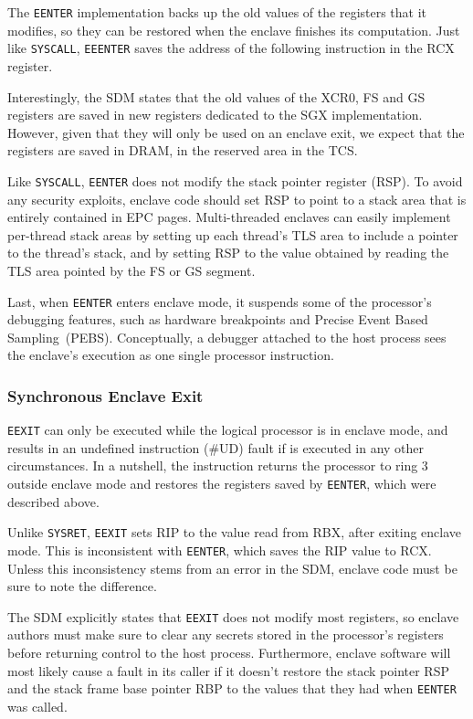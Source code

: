The \texttt{EENTER} implementation backs up the old values of the registers
that it modifies, so they can be restored when the enclave finishes its
computation. Just like \texttt{SYSCALL}, \texttt{EEENTER} saves the address of
the following instruction in the RCX register.

Interestingly, the SDM states that the old values of the XCR0, FS and GS
registers are saved in new registers dedicated to the SGX implementation.
However, given that they will only be used on an enclave exit, we expect that
the registers are saved in DRAM, in the reserved area in the TCS.

Like \texttt{SYSCALL}, \texttt{EENTER} does not modify the stack pointer
register (RSP). To avoid any security exploits, enclave code should set RSP to
point to a stack area that is entirely contained in EPC pages. Multi-threaded
enclaves can easily implement per-thread stack areas by setting up each
thread's TLS area to include a pointer to the thread's stack, and by setting
RSP to the value obtained by reading the TLS area pointed by the FS or GS
segment.

Last, when \texttt{EENTER} enters enclave mode, it suspends some of the
processor's debugging features, such as hardware breakpoints and Precise Event
Based Sampling~(PEBS). Conceptually, a debugger attached to the host process
sees the enclave's execution as one single processor instruction.


\subsubsection{Synchronous Enclave Exit}
\label{sec:sgx_eexit}


\texttt{EEXIT} can only be executed while the logical processor is in enclave
mode, and results in an undefined instruction (\#UD) fault if is executed in
any other circumstances. In a nutshell, the instruction returns the processor
to ring 3 outside enclave mode and restores the registers saved by
\texttt{EENTER}, which were described above.

Unlike \texttt{SYSRET}, \texttt{EEXIT} sets RIP to the value read from RBX,
after exiting enclave mode. This is inconsistent with \texttt{EENTER}, which
saves the RIP value to RCX. Unless this inconsistency stems from an error in
the SDM, enclave code must be sure to note the difference.

The SDM explicitly states that \texttt{EEXIT} does not modify most registers,
so enclave authors must make sure to clear any secrets stored in the
processor's registers before returning control to the host process.
Furthermore, enclave software will most likely cause a fault in its caller if
it doesn't restore the stack pointer RSP and the stack frame base pointer RBP
to the values that they had when \texttt{EENTER} was called.

